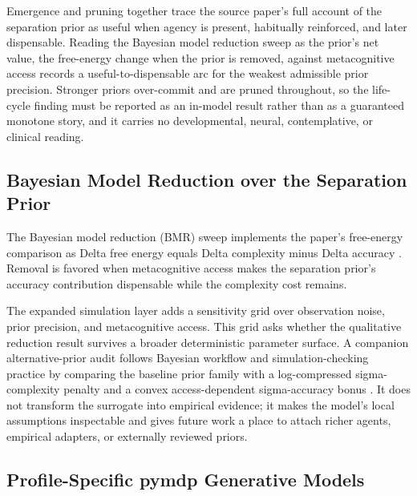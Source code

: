 \documentclass[
]{article}
\begin{document}
Emergence and pruning together trace the source paper's full account of
the separation prior as useful when agency is present, habitually
reinforced, and later dispensable. Reading the Bayesian model reduction
sweep as the prior's net value, the free-energy change when the prior is
removed, against metacognitive access records a useful-to-dispensable
arc for the weakest admissible prior precision. Stronger priors
over-commit and are pruned throughout, so the life-cycle finding must be
reported as an in-model result rather than as a guaranteed monotone
story, and it carries no developmental, neural, contemplative, or
clinical reading.

\subsection{Bayesian Model Reduction over the Separation
Prior}\label{sec:methods-bmr-separation-prior}

The Bayesian model reduction (BMR) sweep implements the paper's
free-energy comparison as Delta free energy equals Delta complexity
minus Delta accuracy \citep{friston2018bmr}. Removal is favored when
metacognitive access makes the separation prior's accuracy contribution
dispensable while the complexity cost remains.

The expanded simulation layer adds a sensitivity grid over observation
noise, prior precision, and metacognitive access. This grid asks whether
the qualitative reduction result survives a broader deterministic
parameter surface. A companion alternative-prior audit follows Bayesian
workflow and simulation-checking practice by comparing the baseline
prior family with a log-compressed sigma-complexity penalty and a convex
access-dependent sigma-accuracy bonus
\citep{talts2018sbc, gelman2020bayesianworkflow}. It does not transform
the surrogate into empirical evidence; it makes the model's local
assumptions inspectable and gives future work a place to attach richer
agents, empirical adapters, or externally reviewed priors.

\subsection{Profile-Specific pymdp Generative
Models}\label{sec:methods-pymdp-generative-models}
\end{document}

